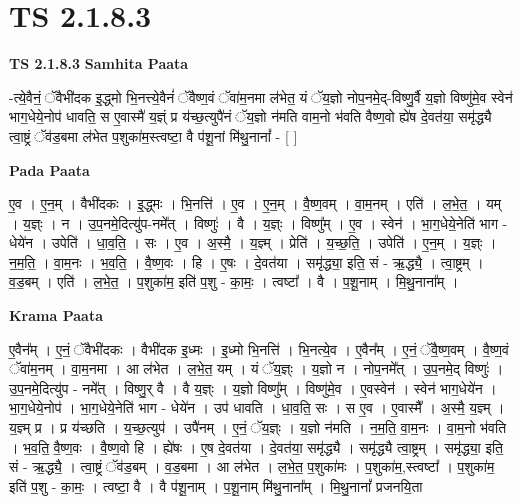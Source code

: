 \documentclass[17pt]{extarticle}
\begin{document}
\section{ TS 2.1.8.3 }

\textbf{TS 2.1.8.3 } \newline
\textbf{Samhita Paata} \newline

-त्ये॒वैनं॒ ॅवैभी॑दक इ॒द्ध्मो भि॒नत्त्ये॒वैनं॑ ॅवैष्ण॒वं ॅवा॑म॒नमा ल॑भेत॒ यं ॅय॒ज्ञो नोप॒नमे॒द्-विष्णु॒र्वै य॒ज्ञो विष्णु॑मे॒व स्वेन॑ भाग॒धेये॒नोप॑ धावति॒ स ए॒वास्मै॑ य॒ज्ञ्ं प्र य॑च्छ॒त्युपै॑नं ॅय॒ज्ञो न॑मति वाम॒नो भ॑वति वैष्ण॒वो ह्ये॑ष दे॒वत॑या॒ समृ॑द्ध्यै त्वा॒ष्ट्रं ॅव॑ड॒बमा ल॑भेत प॒शुका॑म॒स्त्वष्टा॒ वै प॑शू॒नां मि॑थु॒नानां᳚ - [  ] \newline

\textbf{Pada Paata} \newline

ए॒व । ए॒न॒म् । वैभी॑दकः । इ॒द्ध्मः । भि॒नत्ति॑ । ए॒व । ए॒न॒म् । वै॒ष्ण॒वम् । वा॒म॒नम् । एति॑ । ल॒भे॒त॒ । यम् । य॒ज्ञ्ः । न । उ॒प॒नमे॒दित्यु॑प-नमे᳚त् । विष्णुः॑ । वै । य॒ज्ञ्ः । विष्णु᳚म् । ए॒व । स्वेन॑ । भा॒ग॒धेये॒नेति॑ भाग - धेये॑न । उपेति॑ । धा॒व॒ति॒ । सः । ए॒व । अ॒स्मै॒ । य॒ज्ञ्म् । प्रेति॑ । य॒च्छ॒ति॒ । उपेति॑ । ए॒न॒म् । य॒ज्ञ्ः । न॒म॒ति॒ । वा॒म॒नः । भ॒व॒ति॒ । वै॒ष्ण॒वः । हि । ए॒षः । दे॒वत॑या । समृ॑द्ध्या॒ इति॒ सं - ऋ॒द्ध्यै॒ । त्वा॒ष्ट्रम् । व॒ड॒बम् । एति॑ । ल॒भे॒त॒ । प॒शुका॑म॒ इति॑ प॒शु - का॒मः॒ । त्वष्टा᳚ । वै । प॒शू॒नाम् । मि॒थु॒नाना᳚म् ।  \newline


\textbf{Krama Paata} \newline

ए॒वैन᳚म् । ए॒नं॒ ॅवैभी॑दकः । वैभी॑दक इ॒ध्मः । इ॒ध्मो भि॒नत्ति॑ । भि॒नत्ये॒व । ए॒वैन᳚म् । ए॒नं॒ ॅवै॒ष्ण॒वम् । वै॒ष्ण॒वं ॅवा॑म॒नम् । वा॒म॒नमा । आ ल॑भेत । ल॒भे॒त॒ यम् । यं ॅय॒ज्ञ्ः । य॒ज्ञो न । नोप॒नमे᳚त् । उ॒प॒नमे॒द् विष्णुः॑ । उ॒प॒नमे॒दित्यु॑प - नमे᳚त् । विष्णु॒र् वै । वै य॒ज्ञ्ः । य॒ज्ञो विष्णु᳚म् । विष्णु॑मे॒व । ए॒वस्वेन॑ । स्वेन॑ भाग॒धेये॑न । भा॒ग॒धेये॒नोप॑ । भा॒ग॒धेये॒नेति॑ भाग - धेये॑न । उप॑ धावति । धा॒व॒ति॒ सः । स ए॒व । ए॒वास्मै᳚ । अ॒स्मै॒ य॒ज्ञ्म् । य॒ज्ञ्म् प्र । प्र य॑च्छति । य॒च्छ॒त्युप॑ । उपै॑नम् । ए॒नं॒ ॅय॒ज्ञ्ः । य॒ज्ञो न॑मति । न॒म॒ति॒ वा॒म॒नः । वा॒म॒नो भ॑वति । भ॒व॒ति॒ वै॒ष्ण॒वः । वै॒ष्ण॒वो हि । ह्ये॑षः । ए॒ष दे॒वत॑या । दे॒वत॑या॒ समृ॑द्ध्यै । समृ॑द्ध्यै त्वा॒ष्ट्रम् । समृ॑द्ध्या॒ इति॒ सं - ऋ॒द्ध्यै॒ । त्वा॒ष्ट्रं ॅव॑ड॒बम् । व॒ड॒बमा । आ ल॑भेत । ल॒भे॒त॒ प॒शुका॑मः । प॒शुका॑म॒,स्त्वष्टा᳚ । प॒शुका॑म॒ इति॑ प॒शु - का॒मः॒ । त्वष्टा॒ वै । वै प॑शू॒नाम् । प॒शू॒नाम् मि॑थु॒नाना᳚म् । मि॒थु॒नानां᳚ प्रजनयि॒ता \newline
\end{document}
